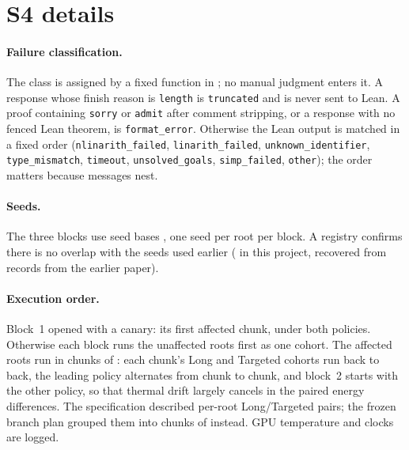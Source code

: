\FloatBarrier
\section{S4 details}
\label{app:cap-details}

\paragraph{Failure classification.}
The class is assigned by a fixed function in ; no manual judgment enters it.  A response whose finish reason is \texttt{length} is \texttt{truncated} and is never sent to Lean.  A proof containing \texttt{sorry} or \texttt{admit} after comment stripping, or a response with no fenced Lean theorem, is \texttt{format\_error}.  Otherwise the Lean output is matched in a fixed order (\texttt{nlinarith\_failed}, \texttt{linarith\_failed}, \texttt{unknown\_identifier}, \texttt{type\_mismatch}, \texttt{timeout}, \texttt{unsolved\_goals}, \texttt{simp\_failed}, \texttt{other}); the order matters because messages nest.

\paragraph{Seeds.}
The three blocks use seed bases \CapSeedBases{}, one seed per root per block.  A registry confirms there is no overlap with the \CapSeedsKnown{} seeds used earlier (\CapSeedsLocal{} in this project, \CapSeedsPredecessor{} recovered from \CapPredecessorScanned{} records from the earlier paper).

\paragraph{Execution order.}
Block~1 opened with a canary: its first affected chunk, under both policies.  Otherwise each block runs the \CapUnaffectedRoots{} unaffected roots first as one cohort.  The \CapAffectedRoots{} affected roots run in chunks of \CapChunkSize{}: each chunk's Long and Targeted cohorts run back to back, the leading policy alternates from chunk to chunk, and block~2 starts with the other policy, so that thermal drift largely cancels in the paired energy differences.  The specification described per-root Long/Targeted pairs; the frozen branch plan grouped them into chunks of \CapChunkSize{} instead.  GPU temperature and clocks are logged.

